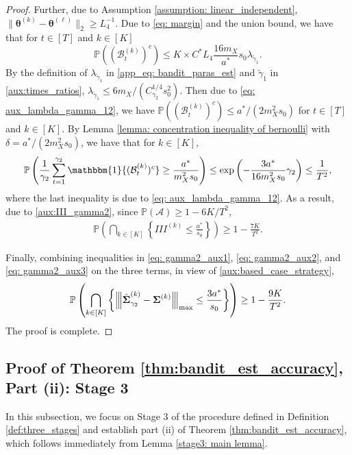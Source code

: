 \documentclass[aos,preprint]{imsart}
\theoremstyle{plain}
\theoremstyle{definition}
\newcommand{\btheta}{\boldsymbol{\theta}}
\newcommand{\idf}{\mathbbm{1}}
\newcommand{\bSigma}{\boldsymbol{\Sigma}}
\newcommand{\op}[1]{{\left\vert\kern-0.25ex\left\vert\kern-0.25ex\left\vert #1\right\vert\kern-0.25ex\right\vert\kern-0.25ex\right\vert}}
\newcommand{\tgamma}{\widetilde{\gamma}}
\newcommand{\hbSigma}{\hat{\boldsymbol{\Sigma}}}
\newcommand{\cA}{\mathcal{A}}
\newcommand{\Pro}{\mathbb{P}}
\begin{document}
\begin{appendix}
\begin{proof}
Further, due to Assumption \ref{assumption: linear_independent}, $\|\btheta^{(k)}-\btheta^{(\ell)}\|_2 \geq L_4^{-1}$. 
Due to \eqref{eq: margin} and the union bound, we have that for $t \in [T]$ and $k \in [K]$
\begin{equation*}  
\Pro((\mathcal{B}_t^{(k)})^{c})\le K \times C^* L_4 \frac{16m_X}{a^*} s_0  \lambda_{\tgamma_1}.
 \end{equation*}
 By the definition of $\lambda_{\tgamma_1}$ in \eqref{app_eq: bandit_paras_est} and $\tgamma_1$ in \eqref{aux:times_ratios}, 
 $\lambda_{\tgamma_1} \leq 6m_X/(C_{\gamma_2}^{1/4} s_0^2)$. Then due to \eqref{eq: aux_lambda_gamma_12}, we have
 $\Pro((\mathcal{B}_t^{(k)})^{c}) \leq a^*/(2m_X^2s_0)$ for $t \in [T]$ and $k \in [K]$. By Lemma \ref{lemma: concentration inequality of bernoulli} with $\delta = a^*/(2m_X^2s_0)$, we have that for $k \in [K]$,
\begin{equation*}
\Pro\left( \frac{1}{\gamma_2}\sum_{t=1}^{\gamma_2}\idf\{(\mathcal{B}_t^{(k)})^{c}\}\ge \frac{a^*}{m_X^2 s_0}   \right)\leq \exp\left(- \frac{3a^*}{16m_X^2s_0} \gamma_2\right) \leq \frac{1}{T^2},
\end{equation*}
where the last inequality is due to \eqref{eq: aux_lambda_gamma_12}. As a result, due to \eqref{aux:III_gamma2}, since $\Pro(\cA) \geq 1-6K/T^2$,  
\begin{align}\label{eq: gamma2_aux3}
    \Pro\left(\bigcap_{k \in [K]}  \left\{III^{(k)} \leq \frac{a^*}{s_0} \right\}\right) \geq 1-\frac{7K}{T^2}.
\end{align}

Finally, combining inequalities in \eqref{eq: gamma2_aux1}, \eqref{eq: gamma2_aux2}, and \eqref{eq: gamma2_aux3} on the three terms, in view of \eqref{aux:based_case_strategy},  
\begin{align*}
    \Pro\left(\bigcap_{k \in [K]}  \left\{\op{\hbSigma_{\gamma_2}^{(k)}-\bSigma^{(k)}}_{\textup{max}} \le \frac{3a^*}{s_0} \right\} \right) \geq 1 - \frac{9K}{T^2}.
\end{align*}
The proof is complete.
\end{proof}



\subsection{Proof of Theorem \ref{thm:bandit_est_accuracy}, Part (ii): Stage 3} \label{sec: proof of thm: regret in stage 3}
In this subsection, we focus on Stage 3 of the procedure defined in Definition \ref{def:three_stages} and establish part (ii) of Theorem \ref{thm:bandit_est_accuracy}, which follows immediately from Lemma \ref{stage3: main lemma}.


\end{appendix}
\end{document}
